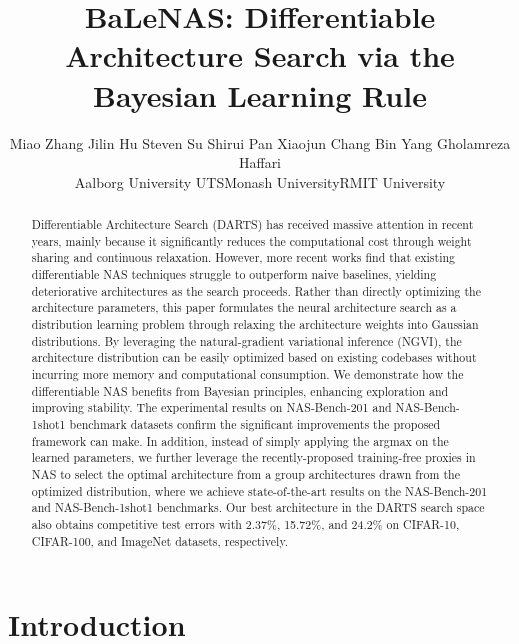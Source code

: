 \documentclass[10pt,twocolumn,letterpaper]{article}
\begin{document}
\title{BaLeNAS: Differentiable Architecture Search via the Bayesian Learning Rule}

\author{Miao Zhang Jilin Hu Steven Su Shirui Pan Xiaojun Chang Bin Yang  Gholamreza Haffari\\
Aalborg University \quad UTS\quad Monash University\quad RMIT University\\



}
\maketitle

\begin{abstract}
Differentiable Architecture Search (DARTS) has received massive attention in recent years, mainly because it significantly reduces the computational cost through weight sharing and continuous relaxation. However, more recent works find that existing differentiable NAS techniques struggle to outperform naive baselines, yielding deteriorative architectures as the search proceeds. Rather than directly optimizing the architecture parameters, this paper formulates the neural architecture search as a distribution learning problem through relaxing the architecture weights into Gaussian distributions. By leveraging the natural-gradient variational inference (NGVI), the architecture distribution can be easily optimized based on existing codebases without incurring more memory and computational consumption. We demonstrate how the differentiable NAS benefits from Bayesian principles, enhancing exploration and improving stability. The experimental results on NAS-Bench-201 and NAS-Bench-1shot1 benchmark datasets confirm the significant improvements the proposed framework can make. In addition, instead of simply applying the argmax on the learned parameters, we further leverage the recently-proposed training-free proxies in NAS to select the optimal architecture from a group architectures drawn from the optimized distribution, where we achieve state-of-the-art results on the NAS-Bench-201 and NAS-Bench-1shot1 benchmarks. Our best architecture in the DARTS search space also obtains competitive test errors with 2.37\%, 15.72\%, and 24.2\% on CIFAR-10, CIFAR-100, and ImageNet datasets, respectively.
\end{abstract}





\section{Introduction}
\label{sec1}
\end{document}
